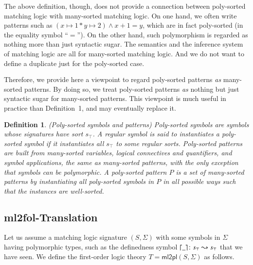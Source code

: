 \documentclass{article}
\theoremstyle{plain}
\newtheorem{defn}[thm]{Definition}
\DeclarePairedDelimiter\ceil{\lceil}{\rceil}
\begin{document}
The above definition, though, does not provide a connection between poly-sorted matching logic with many-sorted matching logic. On one hand, we often write patterns such as $(x \mapsto 1 * y \mapsto 2) \wedge x + 1 = y$, which are in fact poly-sorted (in the equality symbol ``$=$''). On the other hand, such polymorphism is regarded as nothing more than just syntactic sugar. The semantics and the inference system of matching logic are all for many-sorted matching logic. And we do not want to define a duplicate just for the poly-sorted case.

Therefore, we provide here a viewpoint to regard poly-sorted patterns \emph{as} many-sorted patterns. By doing so, we treat poly-sorted patterns \emph{as} nothing but just syntactic sugar for many-sorted patterns. This viewpoint is much useful in practice than Definition~1, and may eventually replace it.

\begin{defn} (Poly-sorted symbols and patterns)
Poly-sorted symbols are symbols whose signatures have sort $s_\top$. A regular symbol is said to \emph{instantiates} a poly-sorted symbol if it instantiates all $s_\top$ to some regular sorts.
	Poly-sorted patterns are built from many-sorted variables, logical connectives and quantifiers, and symbol applications, the same as many-sorted patterns, with the only exception that symbols can be polymorphic. A poly-sorted pattern $P$ is a set of many-sorted patterns by instantiating all poly-sorted symbols in $P$ in all possible ways such that the instances are well-sorted.
\end{defn}

\subsection{\textsf{ml2fol}-Translation}

Let us assume a matching logic signature $(S,\Sigma)$ with some symbols in $\Sigma$ having polymorphic types, such as the definedness symbol $\ceil*{\_} \colon s_\top \leadsto s_\top$ that we have seen. We define the first-order logic theory $T = \mathsf{ml2pl}(S,\Sigma)$ as follows.
\end{document}
